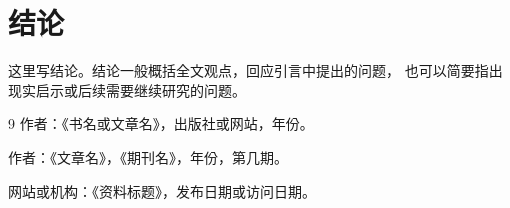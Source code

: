 \documentclass[UTF8,zihao=-4,a4paper]{ctexart}
\begin{document}
%

%

\section{结论}

这里写结论。结论一般概括全文观点，回应引言中提出的问题，
也可以简要指出现实启示或后续需要继续研究的问题。

\begin{thebibliography}{9}
  作者：《书名或文章名》，出版社或网站，年份。

  作者：《文章名》，《期刊名》，年份，第几期。

  网站或机构：《资料标题》，发布日期或访问日期。
\end{thebibliography}

\end{document}
